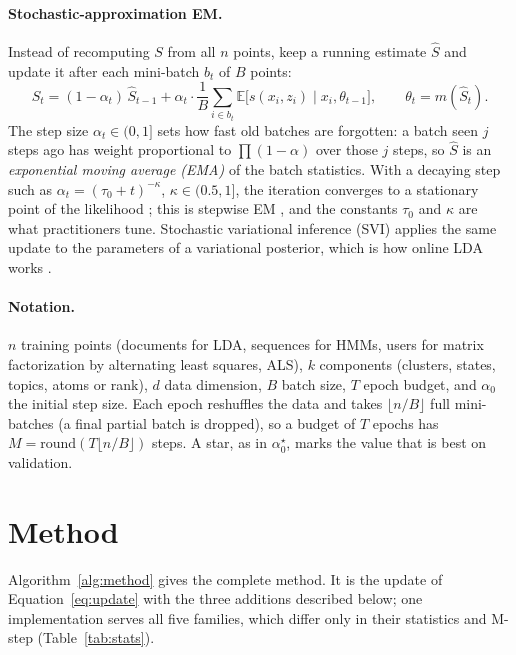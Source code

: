 \documentclass[10pt]{article}
\newcommand{\aopt}{\alpha_0^{\star}}
\begin{document}
\paragraph{Stochastic-approximation EM.} Instead of recomputing $S$ from all $n$ points, keep a running estimate $\hat
S$ and update it after each mini-batch $b_t$ of $B$ points:
\begin{equation}\label{eq:update}
  \hat S_t = (1 - \alpha_t)\, \hat S_{t-1} + \alpha_t \cdot \frac{1}{B}\sum_{i \in b_t}
  \mathbb{E}\big[s(x_i, z_i) \mid x_i, \theta_{t-1}\big], \qquad \theta_t = m(\hat S_t).
\end{equation}
The step size $\alpha_t \in (0, 1]$ sets how fast old batches are forgotten: a batch seen $j$ steps ago has weight
proportional to $\prod (1 - \alpha)$ over those $j$ steps, so $\hat S$ is an \emph{exponential moving average (EMA)} of
the batch statistics. With a decaying step such as $\alpha_t = (\tau_0 + t)^{-\kappa}$, $\kappa \in (0.5, 1]$, the
iteration converges to a stationary point of the likelihood \citep{robbins1951stochastic,cappe2009online}; this is
stepwise EM \citep{liang2009online}, and the constants $\tau_0$ and $\kappa$ are what practitioners tune. Stochastic
variational inference (SVI) applies the same update to the parameters of a variational posterior, which is how
online LDA works \citep{hoffman2013svi}.

\paragraph{Notation.} $n$ training points (documents for LDA, sequences for HMMs, users for matrix factorization by
alternating least squares, ALS), $k$ components
(clusters, states, topics, atoms or rank), $d$ data dimension, $B$ batch size, $T$ epoch budget, and $\alpha_0$ the
initial step size. Each epoch reshuffles the data and takes $\lfloor n/B \rfloor$ full mini-batches (a final partial
batch is dropped), so a budget of $T$ epochs has $M = \mathrm{round}(T \lfloor n/B \rfloor)$ steps. A star, as in $\aopt$, marks the value that is best on
validation.

\section{Method}\label{sec:method}

Algorithm~\ref{alg:method} gives the complete method. It is the update of Equation~\ref{eq:update} with the three
additions described below; one implementation serves all five families, which differ only in their statistics and
M-step (Table~\ref{tab:stats}).
\end{document}
